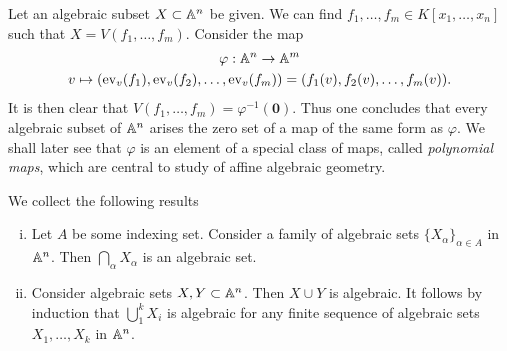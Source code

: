 \begin{remark}\label{AlgebraicSubsetIsZeroSetOfPolynomialMap}
    Let an algebraic subset $X\subset \mathbb{A}^n$ be given. We can find $f_1,\dots,f_m\in K[x_1,\dots,x_n]$ such that $X=V(f_1,\dots,f_m)$. Consider the map 
    \begin{gather*}
        \varphi: \mathbb{A}^n \rightarrow \mathbb{A}^m\\
        v\mapsto \left(\mathrm{ev}_v(f_1),\mathrm{ev}_v(f_2),\dots,\mathrm{ev}_v(f_m)\right) = (f_1(v),f_2(v),\dots,f_m(v)).
    \end{gather*}
    It is then clear that $V(f_1,\dots,f_m)=\varphi^{-1}(\textbf{0})$. Thus one concludes that every algebraic subset of $\mathbb{A}^n$ arises the zero set of a map of the same form as $\varphi$. We shall later see that $\varphi$ is an element of a special class of maps, called \textit{polynomial maps}, which are central to study of affine algebraic geometry. 
\end{remark}
\begin{lemma}\label{AlgebraicSubsetsAreClosedUnderIntersectionAndFiniteUnion}
    We collect the following results
    \begin{enumerate}[(i)]
        \item Let $A$ be some indexing set. Consider a family of algebraic sets $\{X_\alpha\}_{\alpha\in A}$ in $\mathbb{A}^n$. Then $\bigcap_{\alpha} X_\alpha$ is an algebraic set.
        \item Consider algebraic sets $X,Y\subset \mathbb{A}^n$. Then $X\cup Y$ is algebraic. It follows by induction that $\bigcup_1^k X_i$ is algebraic for any finite sequence of algebraic sets $X_1,\dots,X_k$ in $\mathbb{A}^n$.  
    \end{enumerate}
\end{lemma}
